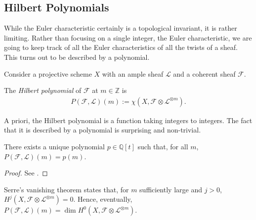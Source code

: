 \documentclass[12pt]{ociamthesis}  %
\begin{document}
\begin{lemma}
\end{lemma}

\begin{lemma}
\end{lemma}

\subsection{Hilbert Polynomials}

While the Euler characteristic certainly is a topological invariant,
it is rather limiting. Rather than focusing on a single integer,
the Euler characteristic,
we are going to keep track of all the Euler characteristics of all
the twists of a sheaf. This turns out to be described by a polynomial.

Consider a projective scheme $X$ with an ample sheaf $\mathscr L$
and a coherent sheaf $\mathscr F$.

\begin{definition}
  The \emph{Hilbert polynomial} of $\mathscr F$ at $m\in\mathbb{Z}$
  is
  \begin{align*}
    P(\mathscr F,\mathscr L)(m) := \chi(X,\mathscr F \otimes \mathscr L^{\otimes m}).
  \end{align*}
\end{definition}

A priori, the Hilbert polynomial is a function taking integers to
integers. The fact that it is described by a polynomial is
surprising and non-trivial.

\begin{lemma}
  There exists a unique polynomial $p\in\mathbb{Q}[t]$ such that,
  for all $m$, $P(\mathscr F,\mathscr L)(m) = p(m)$.
  \begin{proof}
    See \cite[Lemma 1.2.1]{huybrechts2010}.
  \end{proof}
\end{lemma}

\begin{example}
  \missingexample
\end{example}

Serre's vanishing theorem \missingcitation states that,
for $m$ sufficiently large and $j>0$,
$H^j(X,\mathscr F\otimes\mathscr L^{\otimes m})=0$. Hence,
eventually,
$P(\mathscr F,\mathscr L)(m) = \dim H^0(X,\mathscr F\otimes \mathscr L^{\otimes m})$.

\begin{lemma}
\end{lemma}
\end{document}
